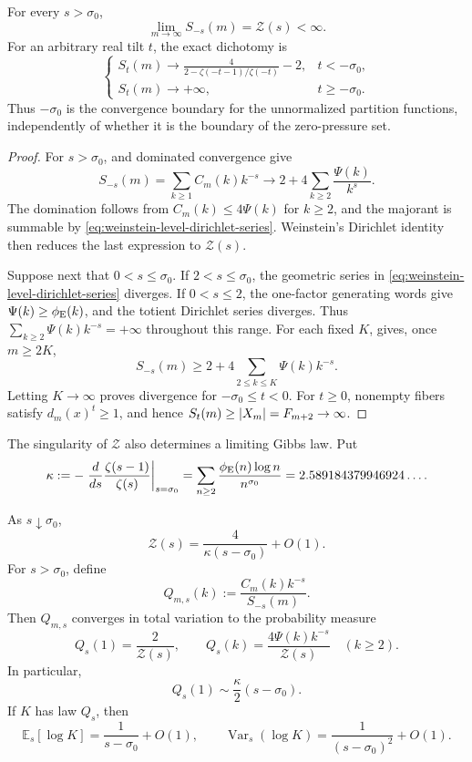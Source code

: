 \begin{theorem}
\label{thm:spectral-partition-function}
For every \(s>\sigma_0\),
\[
 \lim_{m\to\infty}S_{-s}(m)=\mathcal Z(s)<\infty.
\]
For an arbitrary real tilt \(t\), the exact dichotomy is
\[
 \begin{cases}
 S_t(m)\longrightarrow
 \displaystyle\frac{4}{2-\zeta(-t-1)/\zeta(-t)}-2,&t< -\sigma_0,\\[8pt]
 S_t(m)\longrightarrow+\infty,&t\ge-\sigma_0.
 \end{cases}
\]
Thus \(-\sigma_0\) is the convergence boundary for the unnormalized
partition functions, independently of whether it is the boundary of the
zero-pressure set.
\end{theorem}

\begin{proof}
For \(s>\sigma_0\),  and dominated convergence
give
\[
 S_{-s}(m)
 =\sum_{k\ge1}C_m(k)k^{-s}
 \longrightarrow
 2+4\sum_{k\ge2}\frac{\Psi(k)}{k^s}.
\]
The domination follows from \(C_m(k)\le4\Psi(k)\) for \(k\ge2\), and the
majorant is summable by
\eqref{eq:weinstein-level-dirichlet-series}.  Weinstein's Dirichlet identity
then reduces the last expression to \(\mathcal Z(s)\).

Suppose next that \(0<s\le\sigma_0\).  If \(2<s\le\sigma_0\), the geometric
series in \eqref{eq:weinstein-level-dirichlet-series} diverges.  If
\(0<s\le2\), the one-factor generating words give
\(\Psi(k)\ge\phi_{\rm E}(k)\), and the totient Dirichlet series diverges.
Thus \(\sum_{k\ge2}\Psi(k)k^{-s}=+\infty\) throughout this range.  For each
fixed \(K\),  gives, once \(m\ge2K\),
\[
 S_{-s}(m)\ge2+4\sum_{2\le k\le K}\Psi(k)k^{-s}.
\]
Letting \(K\to\infty\) proves divergence for
\(-\sigma_0\le t<0\).  For \(t\ge0\), nonempty fibers satisfy
\(d_m(x)^t\ge1\), and hence
\(S_t(m)\ge\lvert X_m \rvert=F_{m+2}\to\infty\).
\end{proof}

The singularity of \(\mathcal Z\) also determines a limiting Gibbs law.  Put
\[
 \kappa:=-\left.\frac{d}{ds}\frac{\zeta(s-1)}{\zeta(s)}
          \right|_{s=\sigma_0}
 =\sum_{n\ge2}\frac{\phi_{\rm E}(n)\log n}{n^{\sigma_0}}
 =2.589184379946924\ldots.
\]

\begin{theorem}
\label{thm:critical-gibbs-spectrum}
As \(s\downarrow\sigma_0\),
\[
 \mathcal Z(s)=\frac{4}{\kappa(s-\sigma_0)}+O(1).
\]
For \(s>\sigma_0\), define
\[
 Q_{m,s}(k):=\frac{C_m(k)k^{-s}}{S_{-s}(m)}.
\]
Then \(Q_{m,s}\) converges in total variation to the probability measure
\[
 Q_s(1)=\frac2{\mathcal Z(s)},
 \qquad
 Q_s(k)=\frac{4\Psi(k)k^{-s}}{\mathcal Z(s)}\quad(k\ge2).
\]
In particular,
\[
 Q_s(1)\sim\frac\kappa2(s-\sigma_0).
\]
If \(K\) has law \(Q_s\), then
\[
 \mathbb E_s[\log K]
 =\frac1{s-\sigma_0}+O(1),
 \qquad
 \operatorname{Var}_s(\log K)
 =\frac1{(s-\sigma_0)^2}+O(1).
\]
\end{theorem}

